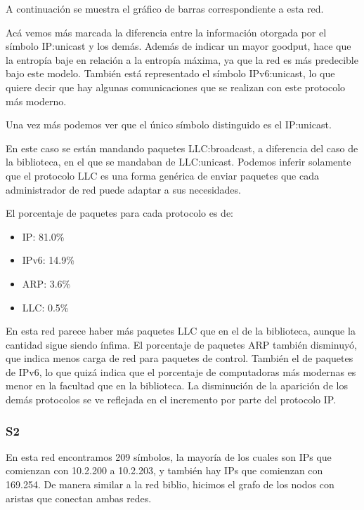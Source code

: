 A continuación se muestra el gráfico de barras correspondiente a esta red.


Acá vemos más marcada la diferencia entre la información otorgada por el
símbolo IP:unicast y los demás. Además de indicar un mayor goodput, 
hace que la entropía baje en relación a la entropía máxima, ya que la
red es más predecible bajo este modelo. También está representado el
símbolo IPv6:unicast, lo que quiere decir que hay algunas comunicaciones
que se realizan con este protocolo más moderno.


Una vez más podemos ver que el único símbolo distinguido es el IP:unicast.


En este caso se están mandando paquetes LLC:broadcast, a diferencia del caso
de la biblioteca, en el que se mandaban de LLC:unicast. Podemos inferir solamente
que el protocolo LLC es una forma genérica de enviar paquetes que cada administrador
de red puede adaptar a sus necesidades.


El porcentaje de paquetes para cada protocolo es de:
\begin{itemize}
\item IP: 81.0\%
\item IPv6: 14.9\%
\item ARP: 3.6\%
\item LLC: 0.5\%
\end{itemize}

En esta red parece haber más paquetes LLC que en el de la biblioteca, aunque la 
cantidad sigue siendo ínfima. El porcentaje de paquetes ARP también disminuyó,
que indica menos carga de red para paquetes de control. También el de paquetes
de IPv6, lo que quizá indica que el porcentaje de computadoras más modernas
es menor en la facultad que en la biblioteca. La disminución de la aparición
de los demás protocolos se ve reflejada en el incremento por parte del protocolo
IP.

\subsubsection{S2}
En esta red encontramos 209 símbolos, la mayoría de los cuales son IPs
que comienzan con 10.2.200 a 10.2.203, y también hay IPs que comienzan
con 169.254. De manera similar a la red biblio, hicimos el grafo de
los nodos con aristas que conectan ambas redes.

